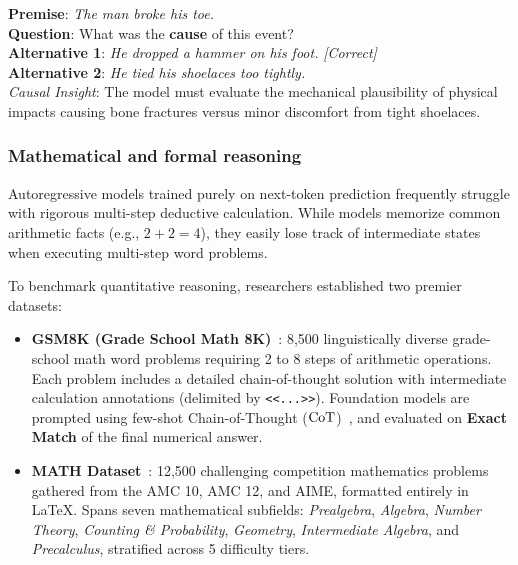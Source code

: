 \documentclass[../../../main.tex]{subfiles}
\begin{document}
\begin{center}
\begin{minipage}{0.95\textwidth}
\begin{tcolorbox}[colback=cardBg,colframe=cardLine,arc=2pt,boxrule=0.5pt,title=\textbf{Task Example: Causal Reasoning (COPA)}]
\small\sffamily
\textbf{Premise}: \textit{The man broke his toe.} \\
\textbf{Question}: What was the \textbf{cause} of this event? \\
\textbf{Alternative 1}: \textit{He dropped a hammer on his foot.} \hfill \textit{[Correct]} \\
\textbf{Alternative 2}: \textit{He tied his shoelaces too tightly.} \\
\textit{Causal Insight}: The model must evaluate the mechanical plausibility of physical impacts causing bone fractures versus minor discomfort from tight shoelaces.
\end{tcolorbox}
\end{minipage}
\end{center}

\subsubsection{Mathematical and formal reasoning}
\label{subsec:mathematical_reasoning}
Autoregressive models trained purely on next-token prediction frequently struggle with rigorous multi-step deductive calculation. While models memorize common arithmetic facts (e.g., $2 + 2 = 4$), they easily lose track of intermediate states when executing multi-step word problems.

To benchmark quantitative reasoning, researchers established two premier datasets:
\begin{itemize}
    \item \textbf{GSM8K (Grade School Math 8K)}~\cite{cobbe2021gsm8k}: 8,500 linguistically diverse grade-school math word problems requiring 2 to 8 steps of arithmetic operations. Each problem includes a detailed chain-of-thought solution with intermediate calculation annotations (delimited by \texttt{<<...>>}). Foundation models are prompted using few-shot Chain-of-Thought ($\mathrm{CoT}$)~\cite{wei2022chain}, and evaluated on \textbf{Exact Match} of the final numerical answer.
    \item \textbf{MATH Dataset}~\cite{hendrycks2021math}: 12,500 challenging competition mathematics problems gathered from the AMC 10, AMC 12, and AIME, formatted entirely in \LaTeX. Spans seven mathematical subfields: \textit{Prealgebra}, \textit{Algebra}, \textit{Number Theory}, \textit{Counting \& Probability}, \textit{Geometry}, \textit{Intermediate Algebra}, and \textit{Precalculus}, stratified across 5 difficulty tiers.
\end{itemize}
\end{document}
